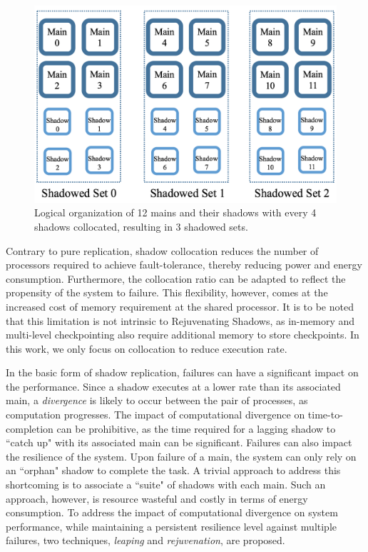 \begin{figure}[!t]
  \begin{center}
      \includegraphics[width=\columnwidth]{figures/logical_org_hpcc}
  \end{center}
  \vskip -0.2in
  \caption{Logical organization of 12 mains and their shadows with every 4 shadows collocated, resulting in 3 shadowed sets.}
  \label{fig:logical_org}
  \vskip -0.25in
\end{figure}

Contrary to pure replication, shadow collocation reduces the number of processors required to achieve fault-tolerance, thereby reducing power and energy consumption. Furthermore, the collocation ratio can be adapted to reflect the propensity of the system to failure. This flexibility, however, comes at the increased cost of memory requirement at the shared processor. It is to be noted that this limitation is not intrinsic to Rejuvenating Shadows, as in-memory and multi-level checkpointing also require additional memory to store checkpoints. In this work, we only focus on collocation to reduce execution rate. 


In the basic form of shadow replication, failures can have a significant impact on the performance. Since a shadow executes at a lower rate than its associated main, a {\it divergence} is likely to occur between the pair of processes, as computation progresses. The impact of computational divergence on time-to-completion can be prohibitive, as the time required for a lagging shadow to ``catch up"  with its associated main can be significant. Failures can also impact the resilience of the system. Upon failure of a main, the system can only rely on an ``orphan" shadow to complete the task. A trivial approach to address this shortcoming is to associate a ``suite" of shadows with each main. Such an approach, however, is resource wasteful and costly in terms of energy consumption. To address the impact of computational divergence on system performance, while maintaining a persistent resilience level against multiple failures, two techniques, \textit{leaping} and \textit{rejuvenation}, are proposed.

